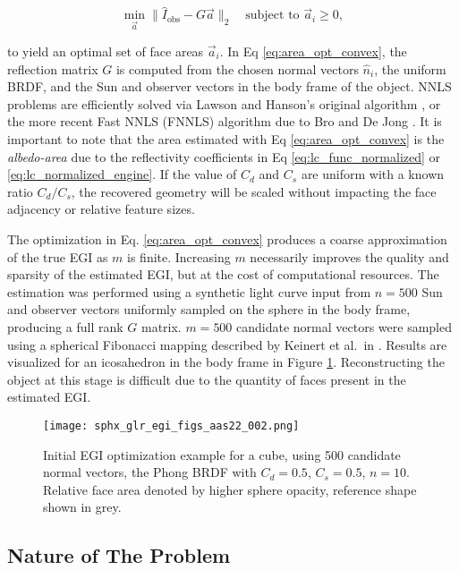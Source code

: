 \begin{equation} \label{eq:area_opt_convex}
  \min_{\vec{a}}{\|\hat{I}_{\textrm{obs}} - G \vec{a}\|_2} \:\:\: \textrm{ subject to } \vec{a}_i \geq 0,
\end{equation}

to yield an optimal set of face areas $\vec{a}_i$. In Eq \ref{eq:area_opt_convex}, the reflection matrix $G$ is computed from the chosen normal vectors $\hat{n}_i$, the uniform BRDF, and the Sun and observer vectors in the body frame of the object. NNLS problems are efficiently solved via Lawson and Hanson's original algorithm \cite{lawson1976}, or the more recent Fast NNLS (FNNLS) algorithm due to Bro and De Jong \cite{bro1996}. It is important to note that the area estimated with Eq \ref{eq:area_opt_convex} is the \textit{albedo-area} due to the reflectivity coefficients in Eq \ref{eq:lc_func_normalized} or \ref{eq:lc_normalized_engine}. If the value of $C_d$ and $C_s$ are uniform with a known ratio $C_d / C_s$, the recovered geometry will be scaled without impacting the face adjacency or relative feature sizes.

The optimization in Eq. \ref{eq:area_opt_convex} produces a coarse approximation of the true EGI as $m$ is finite. Increasing $m$ necessarily improves the quality and sparsity of the estimated EGI, but at the cost of computational resources. The estimation was performed using a synthetic light curve input from $n=500$ Sun and observer vectors uniformly sampled on the sphere in the body frame, producing a full rank $G$ matrix. $m = 500$ candidate normal vectors were sampled using a spherical Fibonacci mapping described by Keinert et al.\ in \cite{keinert2015}. Results are visualized for an icosahedron in the body frame in Figure \ref{fig:initial_egi_sampling}. Reconstructing the object at this stage is difficult due to the quantity of faces present in the estimated EGI. 

\graphicspath{{/Users/liamrobinson/Documents/PyLightCurves/docs/build/html/_images}}
\begin{figure}[!htb]
  \centering
  \texttt{[image: sphx\_glr\_egi\_figs\_aas22\_002.png]}
  \caption{Initial EGI optimization example for a cube, using 500 candidate normal vectors, the Phong BRDF with $C_d=0.5$, $C_s=0.5$, $n=10$. Relative face area denoted by higher sphere opacity, reference shape shown in grey.}
  \label{fig:initial_egi_sampling}
\end{figure}

\subsection{Nature of The Problem}


